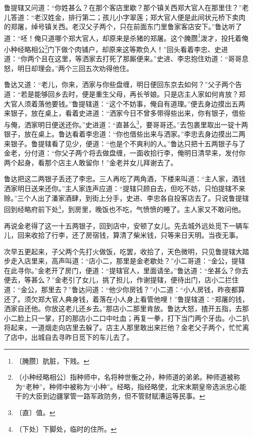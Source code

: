 \documentclass[12pt,UTF-8,openany]{ctexbook}
\begin{document}
\begin{large}
    鲁提辖又问道：“你姓甚么？在那个客店里歇？那个镇关西郑大官人在那里住？”老儿答道：“老汉姓金，排行第二；孩儿小字翠莲；郑大官人便是此间状元桥下卖肉的郑屠，绰号镇关西。老汉父子两个，只在前面东门里鲁家客店安下。”鲁达听了道：“呸！俺只道哪个郑大官人，却原来是杀猪的郑屠。这个腌臜\footnote{〔腌臜〕肮脏，下贱。}泼才，投托着俺小种经略相公\footnote{〔小种经略相公〕指种师中，名将种世衡之孙，种师道的弟弟。种师道被称为“老种”，种师中被称为“小种”。经略，指经略使，北宋末期皇帝选派忠心能干的大臣到边疆掌管一路军政防务，但不管财赋漕运等民事。}门下做个肉铺户，却原来这等欺负人！”回头看着李忠、史进道：“你两个且在这里，等洒家去打死了那厮便来。”史进、李忠抱住劝道：“哥哥息怒，明日却理会。”两个三回五次劝得他住。
    
    鲁达又道：“老儿，你来，洒家与你些盘缠，明日便回东京去如何？”父子两个告道：“若是能够回乡去时，便是重生父母，再长爷娘。只是店主人家如何肯放？郑大官人须着落他要钱。”鲁提辖道：“这个不妨事，俺自有道理。”便去身边摸出五两来银子，放在桌上，看着史进道：“洒家今日不曾多带得些出来，你有银子，借些与俺，洒家明日便送还你。”史进道：“直甚么\footnote{〔直〕值。}，要哥哥还。”去包裹里取出一锭十两银子，放在桌上。鲁达看着李忠道：“你也借些出来与洒家。”李忠去身边摸出二两来银子。鲁提辖看了见少，便道：“也是个不爽利的人。”鲁达只把十五两银子与了金老，分付道：“你父子两个将去做盘缠，一面收拾行李，俺明日清早来，发付你两个起身，看那个店主人敢留你！”金老并女儿拜谢去了。
    
    鲁达把这二两银子丢还了李忠。三人再吃了两角酒，下楼来叫道：“主人家，酒钱洒家明日送来还你。”主人家连声应道：“提辖只顾自去，但吃不妨，只怕提辖不来赊。”三个人出了潘家酒肆，到街上分手，史进、李忠各自投客店去了。只说鲁提辖回到经略府前下处\footnote{〔下处〕下脚处，临时的住所。}，到房里，晚饭也不吃，气愤愤的睡了。主人家又不敢问他。
    
    再说金老得了这一十五两银子，回到店中，安顿了女儿。先去城外远处觅下一辆车儿，回来收拾了行李，还了房宿钱，算清了柴米钱，只等来日天明。当夜无事。
    
    次早五更起来，子父两个先打火做饭，吃罢，收拾了，天色微明，只见鲁提辖大踏步走入店里来，高声叫道：“店小二，那里是金老歇处？”小二哥道：“金公，提辖在此寻你。”金老开了房门，便道：“提辖官人，里面请坐。”鲁达道：“坐甚么？你去便去，等甚么？”金老引了女儿，挑了担儿，作谢提辖，便待出门，店小二拦住道：“金公，那里去？”鲁达问道：“他少你房钱？”小二道：“小人房钱，昨夜都算还了。须欠郑大官人典身钱，着落在小人身上看管他哩！”鲁提辖道：“郑屠的钱，洒家自还他。你放这老儿还乡去。”那店小二那里肯放。鲁达大怒，揸开五指，去那小二脸上只一掌，打的那店小二口中吐血；再复一拳，打下当门两个牙齿。小二扒将起来，一道烟走向店里去躲了。店主人那里敢出来拦他？金老父子两个，忙忙离了店中，出城自去寻昨日觅下的车儿去了。
    

\end{large}
\end{document}
